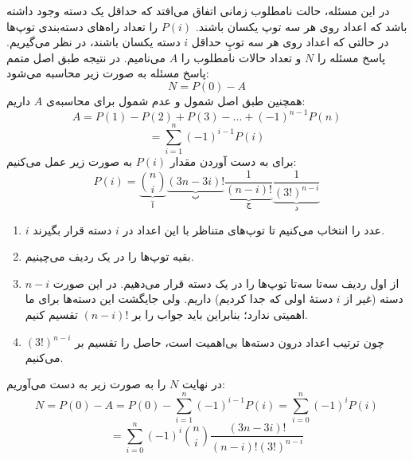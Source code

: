     \p
در این مسئله، حالت نامطلوب زمانی اتفاق می‌افتد که حداقل یک دسته‌ وجود داشته باشد که اعداد روی هر سه توپ یکسان باشند.
$P(i)$
را تعداد راه‌های دسته‌بندی توپ‌ها 
در حالتی که
 اعداد روی هر سه توپِ حداقل
   $i$
دسته یکسان باشند، در نظر می‌گیریم. پاسخ مسئله
را $N$
و تعداد حالات نامطلوب را
 $A$ 
 می‌نامیم. در نتیجه طبق اصل متمم پاسخ مسئله به صورت زیر محاسبه‌ می‌شود:
$$N = P(0) - A$$
همچنین طبق اصل شمول و عدم شمول برای محاسبه‌ی 
$A$
داریم:
$$A = P(1) - P(2) + P(3) - ... + (-1)^{n-1}P(n)$$
$$= \sum\limits_{i = 1}^n (-1)^{i-1} P(i)$$
برای به دست آوردن مقدار 
$P(i)$
به صورت زیر عمل می‌کنیم:
$$P(i) = \underbrace{{n  \choose i}}_{\text{آ}}\underbrace{(3n - 3i)!}_{\text{ب}}\underbrace{\frac{1}{(n - i)!}}_{\text{ج}}\underbrace{\frac{1}{(3!)^{n - i}}}_{\text{د}} $$
\begin{enumerate}
	\item 
    	$i$
    	 عدد را انتخاب می‌کنیم تا توپ‌های متناظر با این اعداد در 
    	 $i$
    	  دسته قرار بگیرند.
    	
	\item 
        بقیه توپ‌ها را در یک ردیف می‌چینیم.

    \item
		از اول ردیف سه‌تا سه‌تا توپ‌ها را در یک دسته قرار می‌دهیم. در این صورت $n - i$ دسته (غیر از 
    	$i$ 
    	دستهٔ اولی که جدا کردیم) داریم. ولی جایگشت این دسته‌ها برای ما اهمیتی ندارد؛ بنابراین باید جواب را بر $(n-i)!$ تقسیم کنیم.
    
    	
    \item     
		  چون ترتیب اعداد درون دسته‌ها بی‌اهمیت است، حاصل را تقسیم بر
		  $(3!)^{n-i}$
		   می‌کنیم.

    
	\end{enumerate}
    در نهایت $N$ 
    را به صورت زیر به دست می‌آوریم:
	$$N = P(0) - A = P(0) - \sum\limits_{i = 1}^n (-1)^{i-1} P(i) = \sum\limits_{i = 0}^n (-1)^{i} P(i)$$
	$$= \sum\limits_{i = 0}^n (-1)^i {n \choose i} \frac{(3n - 3i)!}{(n - i)! (3!)^{n - i}}$$

   